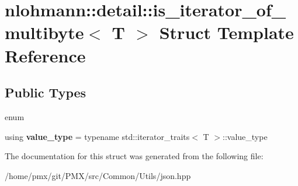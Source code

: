 \hypertarget{structnlohmann_1_1detail_1_1is__iterator__of__multibyte}{}\section{nlohmann\+:\+:detail\+:\+:is\+\_\+iterator\+\_\+of\+\_\+multibyte$<$ T $>$ Struct Template Reference}
\label{structnlohmann_1_1detail_1_1is__iterator__of__multibyte}
\subsection*{Public Types}
\begin{DoxyCompactItemize}
\item 
\mbox{\label{structnlohmann_1_1detail_1_1is__iterator__of__multibyte_a079096610e842b833feb84a1bd04203b}} 
enum 
\item 
\mbox{\label{structnlohmann_1_1detail_1_1is__iterator__of__multibyte_a830339a3ad86d82d32a67f9c180523b1}} 
using {\bfseries value\+\_\+type} = typename std\+::iterator\+\_\+traits$<$ T $>$\+::value\+\_\+type
\end{DoxyCompactItemize}


The documentation for this struct was generated from the following file\+:\begin{DoxyCompactItemize}
\item 
/home/pmx/git/\+P\+M\+X/src/\+Common/\+Utils/json.\+hpp\end{DoxyCompactItemize}
